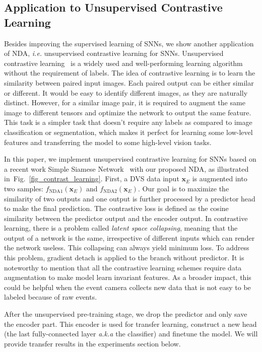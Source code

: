 \documentclass[runningheads]{llncs}
\begin{document}
\subsection{Application to Unsupervised Contrastive Learning}
Besides improving the supervised learning of SNNs, we show another application of NDA, \textit{i.e.} unsupervised contrastive learning for SNNs.  
Unsupervised contrastive learning~\cite{he2020momentum,chen2020simple,chen2020improved,grill2020bootstrap} is a widely used and well-performing learning algorithm without the requirement of labels.
The idea of contrastive learning is to learn the similarity between paired input images. Each paired output can be either similar or different. 
It would be easy to identify different images, as they are naturally distinct. However, for a  similar image pair, it is required to {augment the same image to different tensors and optimize the network to output the same feature}.  
This task is a simpler task that doesn't require any labels as compared to image classification or segmentation, which makes it perfect for learning some low-level features and transferring the model to some high-level vision tasks. 

In this paper, we implement unsupervised contrastive learning for SNNs based on a recent work Simple Siamese Network~\cite{chen2021exploring} with our proposed NDA, as illustrated in~Fig.~\ref{fig_contrast_learning}.
First, a DVS data input ${\bm{x}_E}$ is augmented into two samples: $f_{\text{NDA1}}({\bm{x}_E})$ and $f_{\text{NDA2}}({\bm{x}_E})$. Our goal is to maximize the similarity of two outputs and one output is further processed by a predictor head to make the final prediction. 
The contrastive loss is defined as the cosine similarity between the predictor output and the encoder output. In contrastive learning, there is a problem called \textit{latent space collapsing}, meaning that the output of a network is the same, irrespective of different inputs which can render the network useless. This collapsing can always yield minimum loss. To address this problem, gradient detach is applied to the branch without predictor. 
It is noteworthy to mention that all the contrastive learning schemes require data augmentation to make model learn invariant features. As a broader impact, this could be helpful when the event camera collects new data that is not easy to be labeled because of raw events. 

After the unsupervised pre-training stage, we drop the predictor and only save the encoder part. This encoder is used for transfer learning, \ie construct a new head (the last fully-connected layer \textit{a.k.a} the classifier) and finetune the model. We will provide transfer results in the experiments section below. 
\end{document}
